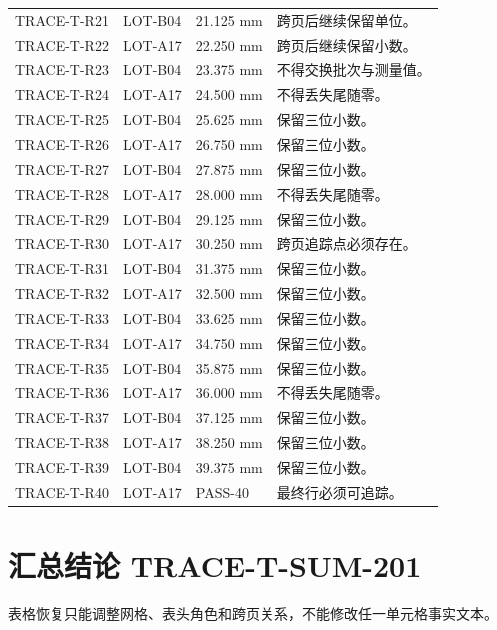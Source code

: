 \documentclass[10pt,a4paper]{ctexart}
\begin{document}
\begin{longtable}{p{28mm}p{28mm}p{30mm}p{55mm}}
TRACE-T-R21 & LOT-B04 & 21.125 mm & 跨页后继续保留单位。\\
TRACE-T-R22 & LOT-A17 & 22.250 mm & 跨页后继续保留小数。\\
TRACE-T-R23 & LOT-B04 & 23.375 mm & 不得交换批次与测量值。\\
TRACE-T-R24 & LOT-A17 & 24.500 mm & 不得丢失尾随零。\\
TRACE-T-R25 & LOT-B04 & 25.625 mm & 保留三位小数。\\
TRACE-T-R26 & LOT-A17 & 26.750 mm & 保留三位小数。\\
TRACE-T-R27 & LOT-B04 & 27.875 mm & 保留三位小数。\\
TRACE-T-R28 & LOT-A17 & 28.000 mm & 不得丢失尾随零。\\
TRACE-T-R29 & LOT-B04 & 29.125 mm & 保留三位小数。\\
TRACE-T-R30 & LOT-A17 & 30.250 mm & 跨页追踪点必须存在。\\
TRACE-T-R31 & LOT-B04 & 31.375 mm & 保留三位小数。\\
TRACE-T-R32 & LOT-A17 & 32.500 mm & 保留三位小数。\\
TRACE-T-R33 & LOT-B04 & 33.625 mm & 保留三位小数。\\
TRACE-T-R34 & LOT-A17 & 34.750 mm & 保留三位小数。\\
TRACE-T-R35 & LOT-B04 & 35.875 mm & 保留三位小数。\\
TRACE-T-R36 & LOT-A17 & 36.000 mm & 不得丢失尾随零。\\
TRACE-T-R37 & LOT-B04 & 37.125 mm & 保留三位小数。\\
TRACE-T-R38 & LOT-A17 & 38.250 mm & 保留三位小数。\\
TRACE-T-R39 & LOT-B04 & 39.375 mm & 保留三位小数。\\
TRACE-T-R40 & LOT-A17 & PASS-40 & 最终行必须可追踪。\\
\end{longtable}

\section{汇总结论 TRACE-T-SUM-201}
表格恢复只能调整网格、表头角色和跨页关系，不能修改任一单元格事实文本。
\end{document}
